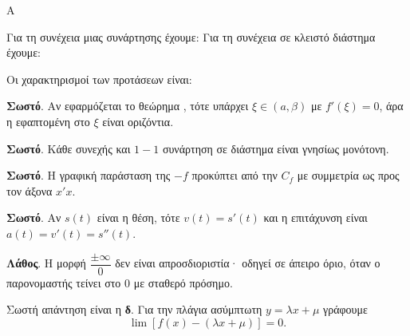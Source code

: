 \begin{thema}{Α}
\begin{erwthma}
\item {}

\item {}

\item Για τη συνέχεια μιας συνάρτησης έχουμε:
Για τη συνέχεια σε κλειστό διάστημα έχουμε:

\item Οι χαρακτηρισμοί των προτάσεων είναι:
\begin{alist}
\item \textbf{Σωστό}. Αν εφαρμόζεται το θεώρημα , τότε υπάρχει $\xi\in(a,\beta)$ με $f'(\xi)=0$, άρα η εφαπτομένη στο $\xi$ είναι οριζόντια.
\item \textbf{Σωστό}. Κάθε συνεχής και $1-1$ συνάρτηση σε διάστημα είναι γνησίως μονότονη.
\item \textbf{Σωστό}. Η γραφική παράσταση της $-f$ προκύπτει από την $C_f$ με συμμετρία ως προς τον άξονα $x'x$.
\item \textbf{Σωστό}. Αν $s(t)$ είναι η θέση, τότε $v(t)=s'(t)$ και η επιτάχυνση είναι $a(t)=v'(t)=s''(t)$.
\item \textbf{Λάθος}. Η μορφή $\dfrac{\pm\infty}{0}$ δεν είναι απροσδιοριστία· οδηγεί σε άπειρο όριο, όταν ο παρονομαστής τείνει στο $0$ με σταθερό πρόσημο.
\end{alist}

\item Σωστή απάντηση είναι η \textbf{δ}. Για την πλάγια ασύμπτωτη $y=\lambda x+\mu$ γράφουμε
\[ \lim\left[f(x)-(\lambda x+\mu)\right]=0. \]
\end{erwthma}
\end{thema}

